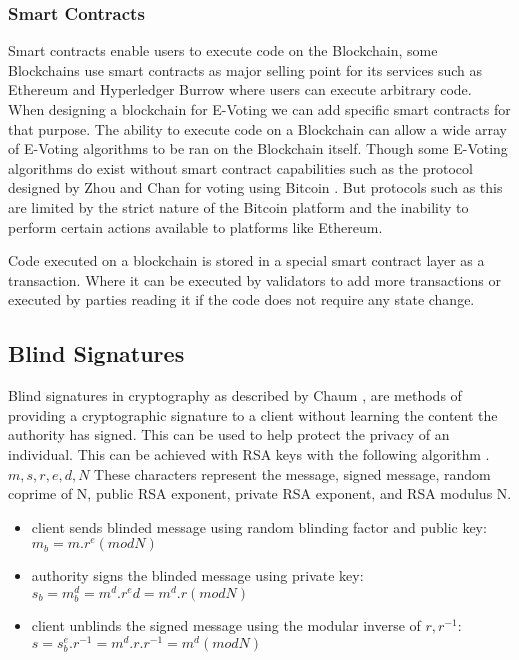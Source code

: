 \documentclass{entcs}
\begin{document}
\subsubsection{Smart Contracts}
Smart contracts enable users to execute code on the Blockchain, some Blockchains use smart contracts as major selling point for its services such as Ethereum \cite{wood2014ethereum} and Hyperledger Burrow \cite{HyperLedgerBurrow} where users can execute arbitrary code. When designing a blockchain for E-Voting we can add specific smart contracts for that purpose. The ability to execute code on a Blockchain can allow a wide array of E-Voting algorithms to be ran on the Blockchain itself. Though some E-Voting algorithms do exist without smart contract capabilities such as the protocol designed by Zhou and Chan for voting using Bitcoin \cite{zhao2015vote}. But protocols such as this are limited by the strict nature of the Bitcoin platform and the inability to perform certain actions available to platforms like Ethereum.

Code executed on a blockchain is stored in a special smart contract layer as a transaction. Where it can be executed by validators to add more transactions or executed by parties reading it if the code does not require any state change.


\subsection{Blind Signatures}
Blind signatures in cryptography as described by Chaum \cite{chaum1983blind}, are methods of providing a cryptographic signature to a client without learning the content the authority has signed. This can be used to help protect the privacy of an individual. This can be achieved with RSA keys with the following algorithm \cite{MITcrypto}.
\(m, s, r, e, d, N\) These characters represent the message, signed message, random coprime of N, public RSA exponent, private RSA exponent, and RSA modulus N.
\begin{itemize}
    \item client sends blinded message using random blinding factor and public key: \\
    \(m_b = m.r^e (mod N)\)
    \item authority signs the blinded message using private key: \\
    \(s_b = m^d_b = m^d.r^ed = m^d.r (mod N)\)
    \item client unblinds the signed message using the modular inverse of \(r, r^{-1}\): \\
    \(s = s^e_b.r^{-1} = m^d.r.r^{-1} = m^d (mod N)\)
\end{itemize}
\end{document}
